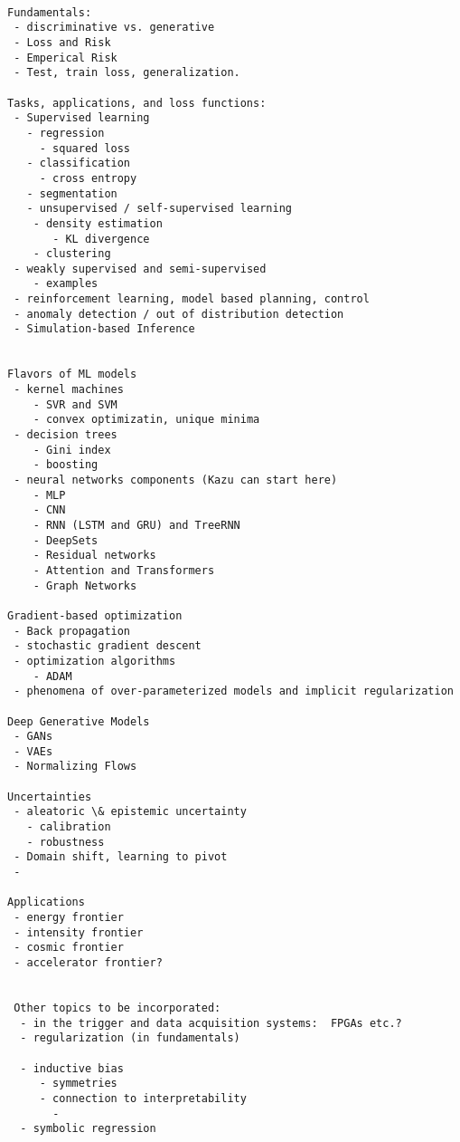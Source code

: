 \begin{verbatim}

Fundamentals:
 - discriminative vs. generative
 - Loss and Risk 
 - Emperical Risk
 - Test, train loss, generalization. 

Tasks, applications, and loss functions:
 - Supervised learning
   - regression
     - squared loss
   - classification
     - cross entropy
   - segmentation
   - unsupervised / self-supervised learning
    - density estimation
       - KL divergence
    - clustering
 - weakly supervised and semi-supervised
    - examples
 - reinforcement learning, model based planning, control
 - anomaly detection / out of distribution detection
 - Simulation-based Inference


Flavors of ML models
 - kernel machines
    - SVR and SVM
    - convex optimizatin, unique minima
 - decision trees
    - Gini index
    - boosting
 - neural networks components (Kazu can start here)
    - MLP
    - CNN
    - RNN (LSTM and GRU) and TreeRNN
    - DeepSets
    - Residual networks
    - Attention and Transformers
    - Graph Networks

Gradient-based optimization
 - Back propagation
 - stochastic gradient descent
 - optimization algorithms
    - ADAM
 - phenomena of over-parameterized models and implicit regularization

Deep Generative Models
 - GANs
 - VAEs
 - Normalizing Flows

Uncertainties
 - aleatoric \& epistemic uncertainty
   - calibration
   - robustness
 - Domain shift, learning to pivot
 - 

Applications
 - energy frontier
 - intensity frontier
 - cosmic frontier
 - accelerator frontier?
 
 
 Other topics to be incorporated:
  - in the trigger and data acquisition systems:  FPGAs etc.?
  - regularization (in fundamentals)
  
  - inductive bias
     - symmetries
     - connection to interpretability 
       - 
  - symbolic regression
 

\end{verbatim}